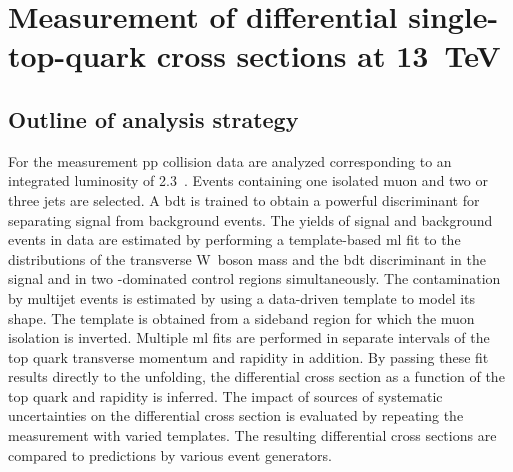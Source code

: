 \chapter{Measurement of differential single-top-quark cross sections at 13~TeV}
\label{ch:diff13}


\section{Outline of analysis strategy}

For the measurement \gls{pp} collision data are analyzed corresponding to an integrated luminosity of 2.3~\invfb. Events containing one isolated muon and two or three jets are selected. A \gls{bdt} is trained to obtain a powerful discriminant for separating signal from background events. The yields of signal and background events in data are estimated by performing a template-based \gls{ml} fit to the distributions of the transverse W~boson mass and the \gls{bdt} discriminant in the signal and in two \ttbar-dominated control regions simultaneously. The contamination by multijet events is estimated by using a data-driven template to model its shape. The template is obtained from a sideband region for which the muon isolation is inverted. Multiple \gls{ml} fits are performed in separate intervals of the top quark transverse momentum and rapidity in addition. By passing these fit results directly to the unfolding, the differential cross section as a function of the top quark \pt and rapidity is inferred. The impact of sources of systematic uncertainties on the differential cross section is evaluated by repeating the measurement with varied templates. The resulting differential cross sections are compared to predictions by various event generators.

